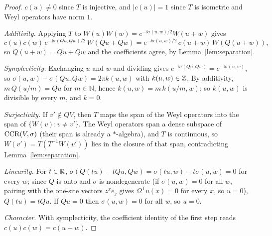 \begin{proof}
$c(u)\neq0$ since $T$ is injective, and $|c(u)|=1$ since $T$ is isometric and Weyl operators have
norm $1$.

\emph{Additivity.} Applying $T$ to $W(u)W(w)=e^{-\ii\sigma(u,w)/2}W(u+w)$ gives
\[c(u)c(w)\,e^{-\ii\sigma(Q u,Q w)/2}\,W(Q u+Q w)=e^{-\ii\sigma(u,w)/2}\,c(u+w)\,W(Q(u+w)),\]
so $Q(u+w)=Q u+Q w$ and the coefficients agree, by Lemma~\ref{lem:separation}.

\emph{Symplecticity.} Exchanging $u$ and $w$ and dividing gives $e^{-\ii\sigma(Q u,Q w)}=
e^{-\ii\sigma(u,w)}$, so $\sigma(u,w)-\sigma(Q u,Q w)=2\pi k(u,w)$ with $k(u,w)\in\mathbb Z$. By additivity,
$m\,Q(u/m)=Q u$ for $m\in\mathbb N$, hence $k(u,w)=m\,k(u/m,w)$; so $k(u,w)$ is divisible by every
$m$, and $k=0$.

\emph{Surjectivity.} If $v'\notin Q V$, then $T$ maps the span of the Weyl operators into the span
of $\{W(v):v\neq v'\}$. The Weyl operators span a dense subspace of $\operatorname{CCR}(V,\sigma)$ (their span is
already a $*$-algebra), and $T$ is continuous, so $W(v')=T(T^{-1}W(v'))$ lies in the closure of that
span, contradicting Lemma~\ref{lem:separation}.

\emph{Linearity.} For $t\in\mathbb R$, $\sigma(Q(tu)-tQ u,Q w)=\sigma(tu,w)-t\sigma(u,w)=0$ for every $w$;
since $Q$ is onto and $\sigma$ is nondegenerate (if $\sigma(u,w)=0$ for all $w$, pairing with the
one-site vectors $z^xe_j$ gives $\Omega^{\mathsf T} u(x)=0$ for every $x$, so $u=0$), $Q(tu)=tQ u$. If $Q u=0$ then
$\sigma(u,w)=0$ for all $w$, so $u=0$.

\emph{Character.} With symplecticity, the coefficient identity of the first step reads
$c(u)c(w)=c(u+w)$.
\end{proof}

\noindent{}

